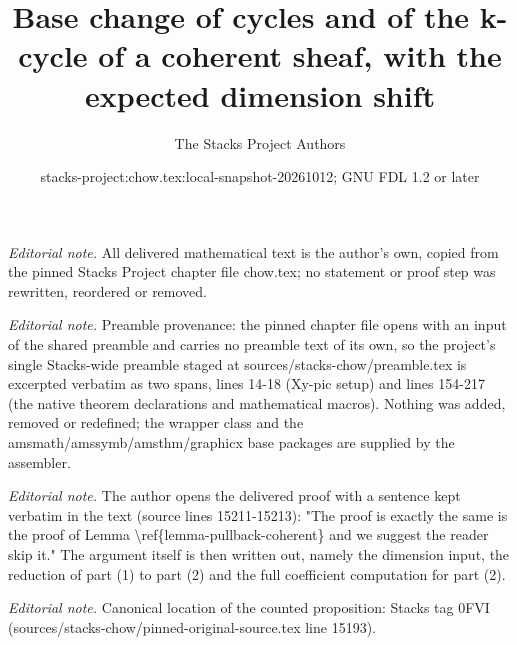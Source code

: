 \documentclass[10pt,a4paper]{amsart}
\title{Base change of cycles and of the k-cycle of a coherent sheaf, with the expected dimension shift}
\author{The Stacks Project Authors}
\date{stacks-project:chow.tex:local-snapshot-20261012; GNU FDL 1.2 or later}
\theoremstyle{plain}
\theoremstyle{definition}
\theoremstyle{remark}
\numberwithin{equation}{subsection}
\begin{document}
\maketitle
\noindent\textit{Editorial note.} All delivered mathematical text is the author's own, copied from the pinned Stacks Project chapter file chow.tex; no statement or proof step was rewritten, reordered or removed.\par\medskip
\noindent\textit{Editorial note.} Preamble provenance: the pinned chapter file opens with an input of the shared preamble and carries no preamble text of its own, so the project's single Stacks-wide preamble staged at sources/stacks-chow/preamble.tex is excerpted verbatim as two spans, lines 14-18 (Xy-pic setup) and lines 154-217 (the native theorem declarations and mathematical macros). Nothing was added, removed or redefined; the wrapper class and the amsmath/amssymb/amsthm/graphicx base packages are supplied by the assembler.\par\medskip
\noindent\textit{Editorial note.} The author opens the delivered proof with a sentence kept verbatim in the text (source lines 15211-15213): "The proof is exactly the same is the proof of Lemma \textbackslash{}ref\{lemma-pullback-coherent\} and we suggest the reader skip it." The argument itself is then written out, namely the dimension input, the reduction of part (1) to part (2) and the full coefficient computation for part (2).\par\medskip
\noindent\textit{Editorial note.} Canonical location of the counted proposition: Stacks tag 0FVI (sources/stacks-chow/pinned-original-source.tex line 15193).\par\medskip
\end{document}
